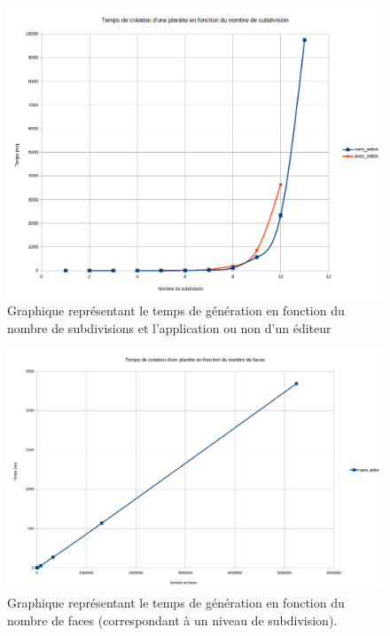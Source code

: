 \documentclass[a4paper]{article}
\begin{document}
\begin{figure}[!ht]
    \begin{center}
        \includegraphics[scale=0.4]{img/perf.png}
        \caption{Graphique représentant le temps de génération en fonction du nombre de subdivisions et l'application ou non d'un éditeur}
        \label{graphperf}
    \end{center}
\end{figure}

\begin{figure}[!ht]
    \begin{center}
        \includegraphics[scale=0.4]{img/result_nbface.png}
        \caption{Graphique représentant le temps de génération en fonction du nombre de faces (correspondant à un niveau de subdivision).}
        \label{graphperfnbface}
    \end{center}
\end{figure}
\end{document}
